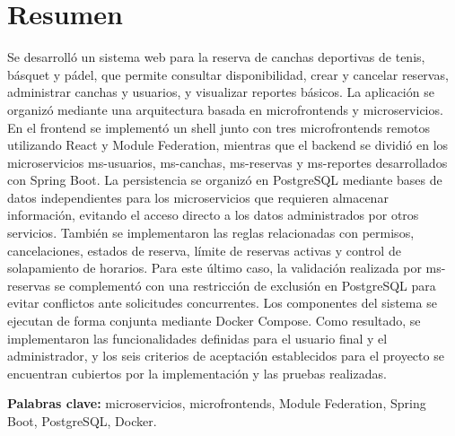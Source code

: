 
\section*{Resumen}

Se desarrolló un sistema web para la reserva de canchas deportivas de tenis,
básquet y pádel, que permite consultar disponibilidad, crear y cancelar reservas,
administrar canchas y usuarios, y visualizar reportes básicos. La aplicación se
organizó mediante una arquitectura basada en microfrontends y microservicios. En
el frontend se implementó un shell junto con tres microfrontends remotos
utilizando React y Module Federation, mientras que el backend se dividió en los
microservicios ms-usuarios, ms-canchas, ms-reservas y ms-reportes desarrollados
con Spring Boot. La persistencia se organizó en PostgreSQL mediante bases de
datos independientes para los microservicios que requieren almacenar
información, evitando el acceso directo a los datos administrados por otros
servicios. También se implementaron las reglas relacionadas con permisos,
cancelaciones, estados de reserva, límite de reservas activas y control de
solapamiento de horarios. Para este último caso, la validación realizada por
ms-reservas se complementó con una restricción de exclusión en PostgreSQL para
evitar conflictos ante solicitudes concurrentes. Los componentes del sistema se
ejecutan de forma conjunta mediante Docker Compose. Como resultado, se
implementaron las funcionalidades definidas para el usuario final y el
administrador, y los seis criterios de aceptación establecidos para el proyecto
se encuentran cubiertos por la implementación y las pruebas realizadas.

\vspace{0.5cm}
\noindent\textbf{Palabras clave:} microservicios, microfrontends,
Module Federation, Spring Boot, PostgreSQL, Docker.